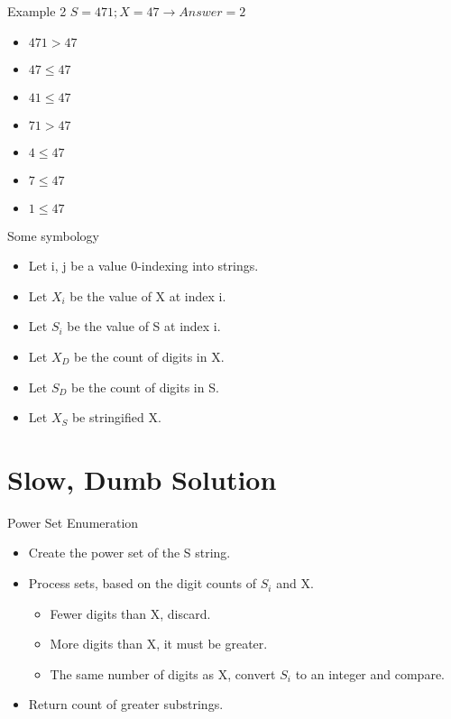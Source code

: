 \documentclass[10pt]{beamer}
\begin{document}
\begin{frame}{Example 2}
  \Large
  $S = 471; X = 47 \rightarrow Answer = 2$ \\
  \begin{itemize}[<+->]
    \item $471 > 47$    
    \item $47 \le 47$   
    \item $41 \le 47$
    \item $71 > 47$     
    \item $4 \le 47$
    \item $7 \le 47$
    \item $1 \le 47$
  \end{itemize}
\end{frame}

\begin{frame}{Some symbology}
  \Large
  \begin{itemize} %
    \item Let i, j be a value 0-indexing into strings.
    \item Let $X_{i}$ be the value of X at index i.
    \item Let $S_{i}$ be the value of S at index i.
    \item Let $X_{D}$ be the count of digits in X.
    \item Let $S_{D}$ be the count of digits in S.
    \item Let $X_{S}$ be stringified X.
  \end{itemize}
\end{frame}

\section{Slow, Dumb Solution}

\begin{frame}{Power Set Enumeration}
  \Large
  \begin{itemize} %
    \item Create the power set of the S string.
    \item Process sets, based on the digit counts of $S_i$ and X.
      \begin{itemize}
        \large
        \item Fewer digits than X, discard.
        \item More digits than X, it must be greater.
        \item The same number of digits as X, convert $S_i$ to an integer and compare.
      \end{itemize}
    \item Return count of greater substrings.
  \end{itemize}
\end{frame}
\end{document}
